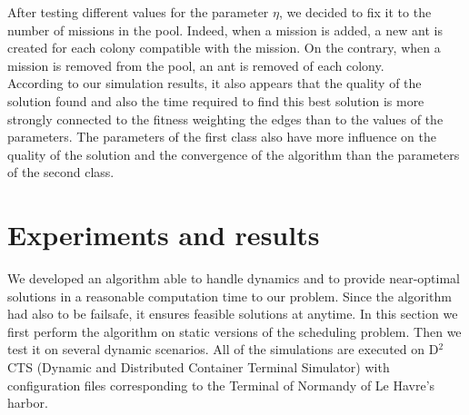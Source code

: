 \documentclass[a4paper,10pt]{article}
\begin{document}
After testing different values for the parameter $\eta$, we decided to fix it to the number of missions in the pool. Indeed, when a mission is added, a new ant is created for each colony compatible with the mission. On the contrary, when a mission is removed from the pool, an ant is removed of each colony.\\

According to our simulation results, it also appears that the quality of the solution found and also the time required to find this best solution is more strongly connected to the fitness weighting the edges than to the values of the parameters. The parameters of the first class also have more influence on the quality of the solution and the convergence of the algorithm than the parameters of the second class.

\section{Experiments and results}
   We developed an algorithm able to handle dynamics and to provide near-optimal solutions in a reasonable computation time to our problem. Since the algorithm had also to be failsafe, it ensures feasible solutions at anytime. In this section we first perform the algorithm on static versions of the scheduling problem. Then we test it on several dynamic scenarios.
   All of the simulations are executed on D$^2$CTS (Dynamic and Distributed Container Terminal Simulator)\cite{Lesauvage2011} with configuration files corresponding to the Terminal of Normandy of Le Havre's harbor.
\end{document}
